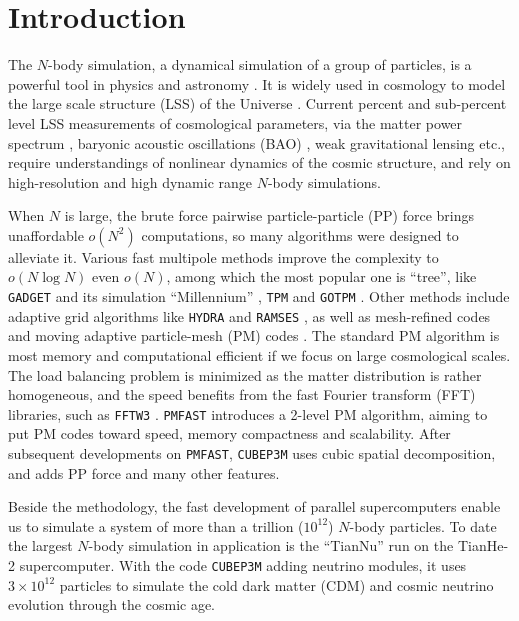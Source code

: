 \documentclass[10pt,twocolumn,preprint]{emulateapj}
\newcommand{\tcb}{\textcolor{blue}}
\begin{document}
\section{Introduction}\label{s.intro}
The $N$-body simulation, a dynamical simulation of a group of particles, is a powerful tool in physics and astronomy \citep{1988csup.book.....H}. It is widely used in cosmology to model the large scale structure (LSS) of the Universe \citep{1985ApJ...292..371D}. Current percent and sub-percent level LSS measurements of cosmological parameters, via the matter power spectrum \citep{2005MNRAS.360L..82R,2011ApJ...726....7T}, baryonic acoustic oscillations (BAO) \citep{2005ApJ...633..560E,2009ApJ...700..479T}, weak gravitational lensing \citep{2003ApJ...592..699V,2009A&A...499...31H,2009ApJ...701..945S} etc., require understandings of nonlinear dynamics of the cosmic structure, and rely on high-resolution and high dynamic range $N$-body simulations.

When $N$ is large, the brute force pairwise particle-particle (PP) force brings unaffordable $o(N^2)$ computations, so many algorithms were designed to alleviate it. Various fast multipole methods \tcb{\citep{1985JCoPh..60..187R,2014ComAC...1....1D,2016ascl.soft09016P}} improve the complexity to $o(N\log N)$ even $o(N)$, among which the most popular one is ``tree'', like {\tt GADGET} \citep{2001NewA....6...79S,2005MNRAS.364.1105S} and its simulation ``Millennium'' \citep{2005Natur.435..629S,2012MNRAS.426.2046A}, {\tt TPM} \citep{1995ApJS...98..355X} and {\tt GOTPM} \citep{2004NewA....9..111D}. Other methods include adaptive grid algorithms like {\tt HYDRA} \citep{1995ApJ...452..797C} and {\tt RAMSES} \citep{2010ascl.soft11007T}, as well as mesh-refined codes \citep{1991ApJ...368L..23C} and moving adaptive particle-mesh (PM) codes \citep{1995ApJS..100..269P}. The standard PM algorithm \citep{1988csup.book.....H} is most memory and computational efficient if we focus on large cosmological scales. The load balancing problem is minimized as the matter distribution is rather homogeneous, and the speed benefits from the fast Fourier transform (FFT) libraries, such as {\tt FFTW3} \citep{Frigo05thedesign}. {\tt PMFAST} \citep{2005NewA...10..393M} introduces a 2-level PM algorithm, aiming to put PM codes toward speed, memory compactness and scalability. After subsequent developments on {\tt PMFAST}, {\tt CUBEP3M} \citep{2013MNRAS.436..540H} uses cubic spatial decomposition, and adds PP force and many other features.

Beside the methodology, the fast development of parallel supercomputers enable us to simulate a system of more than a trillion ($10^{12}$) $N$-body particles. To date the largest $N$-body simulation in application is the ``TianNu'' \citep{2017NatAs...1E.143Y,2017RAA....17...85E} run on the TianHe-2 supercomputer. With the code {\tt CUBEP3M} adding neutrino modules, it uses $3\times 10^{12}$ particles to simulate the cold dark matter (CDM) and cosmic neutrino evolution through the cosmic age.
\end{document}
